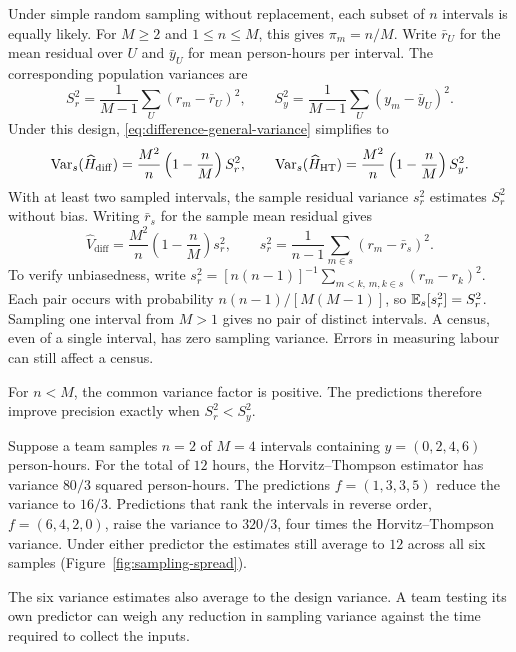 Under simple random sampling without replacement, each subset of $n$ intervals is equally likely. For $M\geq2$ and $1\leq n\leq M$, this gives $\pi_m=n/M$. Write $\bar r_U$ for the mean residual over $U$ and $\bar y_U$ for mean person-hours per interval. The corresponding population variances are
\[
 S_r^2=\frac{1}{M-1}\sum_U(r_m-\bar r_U)^2,
 \qquad
 S_y^2=\frac{1}{M-1}\sum_U(y_m-\bar y_U)^2.
\]
Under this design, \eqref{eq:difference-general-variance} simplifies to
\begin{equation}
 \operatorname{Var}_s(\widehat H_{\mathrm{diff}})
 =\frac{M^2}{n}\left(1-\frac nM\right)S_r^2,
 \qquad
 \operatorname{Var}_s(\widehat H_{\mathrm{HT}})
 =\frac{M^2}{n}\left(1-\frac nM\right)S_y^2.
 \label{eq:difference-srs-variance}
\end{equation}
With at least two sampled intervals, the sample residual variance $s_r^2$ estimates $S_r^2$ without bias. Writing $\bar r_s$ for the sample mean residual gives
\begin{equation}
 \widehat V_{\mathrm{diff}}
 =\frac{M^2}{n}\left(1-\frac nM\right)s_r^2,
 \qquad
 s_r^2=\frac{1}{n-1}\sum_{m\in s}(r_m-\bar r_s)^2.
 \label{eq:difference-srs-variance-estimator}
\end{equation}
To verify unbiasedness, write $s_r^2=[n(n-1)]^{-1}\sum_{m<k,\,m,k\in s}(r_m-r_k)^2$. Each pair occurs with probability $n(n-1)/[M(M-1)]$, so $\mathbb E_s[s_r^2]=S_r^2$. Sampling one interval from $M>1$ gives no pair of distinct intervals. A census, even of a single interval, has zero sampling variance. Errors in measuring labour can still affect a census.

For $n<M$, the common variance factor is positive. The predictions therefore improve precision exactly when $S_r^2<S_y^2$.

Suppose a team samples $n=2$ of $M=4$ intervals containing $y=(0,2,4,6)$ person-hours. For the total of $12$ hours, the Horvitz--Thompson estimator has variance $80/3$ squared person-hours. The predictions $f=(1,3,3,5)$ reduce the variance to $16/3$. Predictions that rank the intervals in reverse order, $f=(6,4,2,0)$, raise the variance to $320/3$, four times the Horvitz--Thompson variance. Under either predictor the estimates still average to $12$ across all six samples (Figure~\ref{fig:sampling-spread}).



The six variance estimates also average to the design variance. A team testing its own predictor can weigh any reduction in sampling variance against the time required to collect the inputs.

